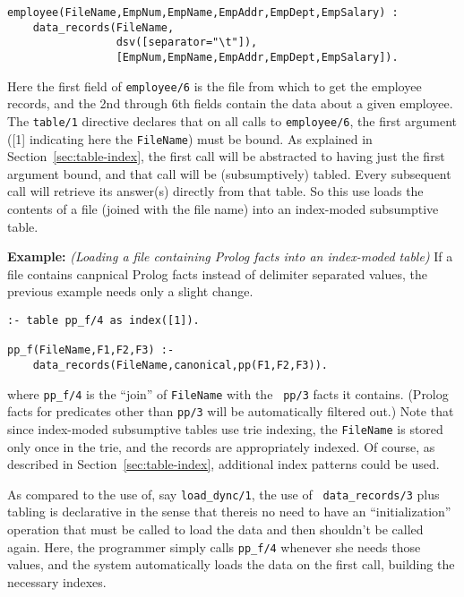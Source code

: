 \begin{description}
\begin{verbatim}
employee(FileName,EmpNum,EmpName,EmpAddr,EmpDept,EmpSalary) :
    data_records(FileName,
                 dsv([separator="\t"]),
                 [EmpNum,EmpName,EmpAddr,EmpDept,EmpSalary]).
\end{verbatim}
Here the first field of {\tt employee/6} is the file from which to get
the employee records, and the 2nd through 6th fields contain the data
about a given employee.  The {\tt table/1} directive declares that on
all calls to {\tt employee/6}, the first argument ([1] indicating here
the {\tt FileName}) must be bound.  As explained in
Section~\ref{sec:table-index}, the first call will be abstracted to
having just the first argument bound, and that call will be
(subsumptively) tabled.  Every subsequent call will retrieve its
answer(s) directly from that table.  So this use loads the contents of
a file (joined with the file name) into an index-moded subsumptive
table.

{\bf Example:} {\em (Loading a file containing Prolog facts into an
  index-moded table)} If a file contains canpnical Prolog
facts instead of delimiter separated values, the previous example
needs only a slight change.
\begin{verbatim}
:- table pp_f/4 as index([1]).

pp_f(FileName,F1,F2,F3) :-
    data_records(FileName,canonical,pp(F1,F2,F3)).
\end{verbatim}

where {\tt pp\_f/4} is the ``join'' of {\tt FileName} with the {\tt
  pp/3} facts it contains.  (Prolog facts for predicates other than
{\tt pp/3} will be automatically filtered out.)  Note that since
index-moded subsumptive tables use trie indexing, the {\tt FileName}
is stored only once in the trie, and the records are appropriately
indexed.  Of course, as described in Section~\ref{sec:table-index},
additional index patterns could be used.

As compared to the use of, say {\tt load\_dync/1}, the use of {\tt
  data\_records/3} plus tabling is declarative in the sense that
thereis no need to have an ``initialization'' operation that must be
called to load the data and then shouldn't be called again.  Here, the
programmer simply calls {\tt pp\_f/4} whenever she needs those values,
and the system automatically loads the data on the first call,
building the necessary indexes.  

\end{description}

